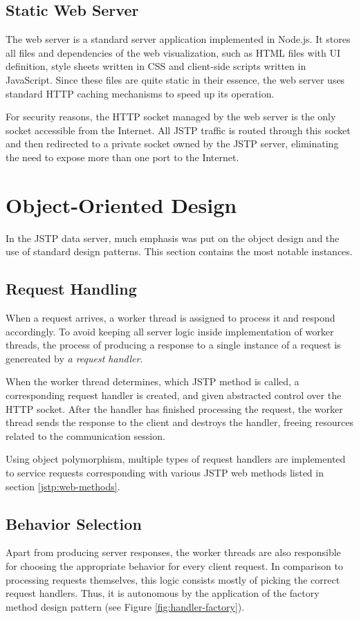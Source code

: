 \subsection{Static Web Server}
The web server is a standard server application implemented in Node.js. It stores all files and dependencies of the web visualization, such as HTML files with UI definition, style sheets written in CSS and client-side scripts written in JavaScript. Since these files are quite static in their essence, the web server uses standard HTTP caching mechanisms to speed up its operation.

For security reasons, the HTTP socket managed by the web server is the only socket accessible from the Internet. All JSTP traffic is routed through this socket and then redirected to a private socket owned by the JSTP server, eliminating the need to expose more than one port to the Internet.

\section{Object-Oriented Design}
In the JSTP data server, much emphasis was put on the object design and the use of standard design patterns. This section contains the most notable instances.

\subsection{Request Handling}
When a request arrives, a worker thread is assigned to process it and respond accordingly. To avoid keeping all server logic inside implementation of worker threads, the process of producing a response to a single instance of a request is genereated by \textit{a request handler}.

When the worker thread determines, which JSTP method is called, a corresponding request handler is created, and given abstracted control over the HTTP socket. After the handler has finished processing the request, the worker thread sends the response to the client and destroys the handler, freeing resources related to the communication session.

Using object polymorphism, multiple types of request handlers are implemented to service requests corresponding with various JSTP web methods listed in section \ref{jstp:web-methods}.

\subsection{Behavior Selection}
Apart from producing server responses, the worker threads are also responsible for choosing the appropriate behavior for every client request. In comparison to processing requests themselves, this logic consists mostly of picking the correct request handlers. Thus, it is autonomous by the application of the factory method design pattern (see Figure \ref{fig:handler-factory}).

